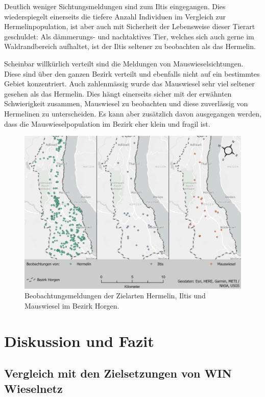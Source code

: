 \documentclass[
  oneside]{scrbook}
\begin{document}
Deutlich weniger Sichtungsmeldungen sind zum Iltis eingegangen. Dies wiederspiegelt einerseits die tiefere Anzahl Individuen im Vergleich zur Hermelinpopulation, ist aber auch mit Sicherheit der Lebensweise dieser Tierart geschuldet: Als dämmerungs- und nachtaktives Tier, welches sich auch gerne im Waldrandbereich aufhaltet, ist der Iltis seltener zu beobachten als das Hermelin.

Scheinbar willkürlich verteilt sind die Meldungen von Mauswieselsichtungen. Diese sind über den ganzen Bezirk verteilt und ebenfalls nicht auf ein bestimmtes Gebiet konzentriert. Auch zahlenmässig wurde das Mauswiesel sehr viel seltener gesehen als das Hermelin. Dies hängt einerseits sicher mit der erwähnten Schwierigkeit zusammen, Mauswiesel zu beobachten und diese zuverlässig von Hermelinen zu unterscheiden. Es kann aber zusätzlich davon ausgegangen werden, dass die Mauswieselpopulation im Bezirk eher klein und fragil ist.



\begin{figure}
\includegraphics[width=1\linewidth]{images/Layout_Beobachtungsmeldungen} \caption{Beobachtungsmeldungen der Zielarten Hermelin, Iltis und Mauswiesel im Bezirk Horgen.}\label{fig:layoutbeobachtungsmeldungen}
\end{figure}

\hypertarget{diskussion-und-fazit}{%
\chapter{Diskussion und Fazit}\label{diskussion-und-fazit}}

\hypertarget{vergleich-mit-den-zielsetzungen-von-win-wieselnetz}{%
\section{Vergleich mit den Zielsetzungen von WIN Wieselnetz}\label{vergleich-mit-den-zielsetzungen-von-win-wieselnetz}}
\end{document}
